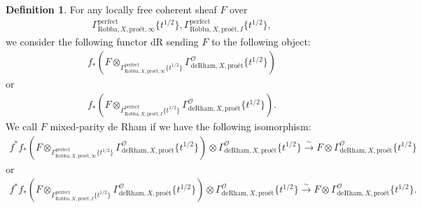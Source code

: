 \documentclass[12pt]{book}
\theoremstyle{definition}
\newtheorem{definition}{Definition}
\begin{document}
\begin{definition}
For any locally free coherent sheaf $F$ over
\begin{align}
\Gamma^\mathrm{perfect}_{\text{Robba},X,\text{pro\'et},\infty}\{t^{1/2}\},\Gamma^\mathrm{perfect}_{\text{Robba},X,\text{pro\'et},I}\{t^{1/2}\},
\end{align} 
we consider the following functor $\mathrm{dR}$ sending $F$ to the following object:
\begin{align}
f_*(F\otimes_{\Gamma^\mathrm{perfect}_{\text{Robba},X,\text{pro\'et},\infty}\{t^{1/2}\}} \Gamma^\mathcal{O}_{\text{deRham},X,\text{pro\'et}}\{t^{1/2}\})
\end{align}
or 
\begin{align}
f_*(F\otimes_{\Gamma^\mathrm{perfect}_{\text{Robba},X,\text{pro\'et},I}\{t^{1/2}\}} \Gamma^\mathcal{O}_{\text{deRham},X,\text{pro\'et}}\{t^{1/2}\}).
\end{align}
We call $F$ mixed-parity de Rham if we have the following isomorphism:
\begin{align}
f^*f_*(F\otimes_{\Gamma^\mathrm{perfect}_{\text{Robba},X,\text{pro\'et},\infty}\{t^{1/2}\}} \Gamma^\mathcal{O}_{\text{deRham},X,\text{pro\'et}}\{t^{1/2}\}) \otimes \Gamma^\mathcal{O}_{\text{deRham},X,\text{pro\'et}}\{t^{1/2}\} \overset{\sim}{\longrightarrow} F \otimes \Gamma^\mathcal{O}_{\text{deRham},X,\text{pro\'et}}\{t^{1/2}\} 
\end{align}
or 
\begin{align}
f^*f_*(F\otimes_{\Gamma^\mathrm{perfect}_{\text{Robba},X,\text{pro\'et},I}\{t^{1/2}\}} \Gamma^\mathcal{O}_{\text{deRham},X,\text{pro\'et}}\{t^{1/2}\}) \otimes \Gamma^\mathcal{O}_{\text{deRham},X,\text{pro\'et}}\{t^{1/2}\} \overset{\sim}{\longrightarrow} F \otimes \Gamma^\mathcal{O}_{\text{deRham},X,\text{pro\'et}}\{t^{1/2}\}. 
\end{align}
\end{definition}
\end{document}
